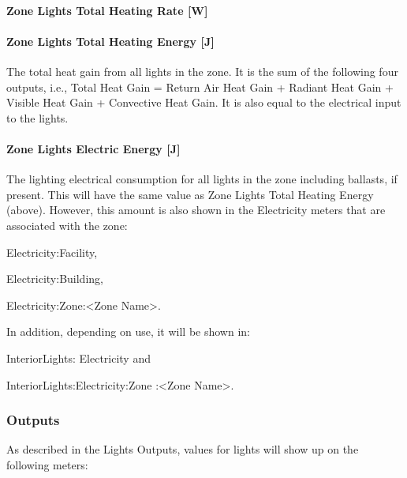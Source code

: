 \paragraph{Zone Lights Total Heating Rate {[}W{]}}\label{zone-lights-total-heating-rate-w}

\paragraph{Zone Lights Total Heating Energy {[}J{]}}\label{zone-lights-total-heating-energy-j}

The total heat gain from all lights in the zone. It is the sum of the following four outputs, i.e., Total Heat Gain = Return Air Heat Gain + Radiant Heat Gain + Visible Heat Gain + Convective Heat Gain. It is also equal to the electrical input to the lights.

\paragraph{Zone Lights Electric Energy {[}J{]}}\label{zone-lights-electric-energy-j}

The lighting electrical consumption for all lights in the zone including ballasts, if present. This will have the same value as Zone Lights Total Heating Energy (above). However, this amount is also shown in the Electricity meters that are associated with the zone:

Electricity:Facility,

Electricity:Building,

Electricity:Zone:\textless{}Zone Name\textgreater{}.

In addition, depending on use, it will be shown in:

InteriorLights: Electricity and

InteriorLights:Electricity:Zone :\textless{}Zone Name\textgreater{}.

\subsubsection{Outputs}\label{outputs-3-010}

As described in the Lights Outputs, values for lights will show up on the following meters:

